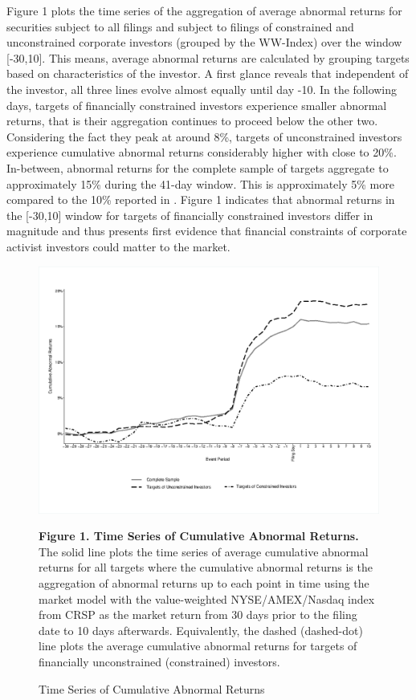 \documentclass[12pt]{article}
\begin{document}
\noindent Figure 1 plots the time series of the aggregation of average abnormal returns for securities subject to all filings and subject to filings of constrained and unconstrained corporate investors (grouped by the WW-Index) over the window [-30,10]. This means, average abnormal returns are calculated by grouping targets based on characteristics of the investor. A first glance reveals that independent of the investor, all three lines evolve almost equally until day -10. In the following days, targets of financially constrained investors experience smaller abnormal returns, that is their aggregation continues to proceed below the other two. Considering the fact they peak at around 8\%, targets of unconstrained investors experience cumulative abnormal returns considerably higher with close to 20\%. In-between, abnormal returns for the complete sample of targets aggregate to approximately 15\% during the 41-day window. This is approximately 5\% more compared to the 10\% reported in \citet[p.1563]{Collin-Dufresne2015}. 
Figure 1 indicates that abnormal returns in the [-30,10] window for targets of financially constrained investors differ in magnitude and thus presents first evidence that financial constraints of corporate activist investors could matter to the market.
\begin{figure}[!htb]
	\centering
	\captionsetup{textformat=empty,labelformat=blank}
	\caption{Time Series of Cumulative Abnormal Returns}
	\begin{adjustbox}{width=\textwidth}
		\includegraphics{WW-TimeS_copy.eps} \label{AR}
	\end{adjustbox}
	\justifying
	\noindent\footnotesize{}\textbf{Figure 1. Time Series of Cumulative Abnormal Returns.} The solid line plots the time series of average cumulative abnormal returns for all targets where the cumulative abnormal returns is the aggregation of abnormal returns up to each point in time using the market model with the value-weighted NYSE/AMEX/Nasdaq index from CRSP as the market return from 30 days prior to the filing date to 10 days afterwards. Equivalently, the dashed (dashed-dot) line plots the average cumulative abnormal returns for targets of financially unconstrained (constrained) investors. \par\medskip
\end{figure}
\end{document}
